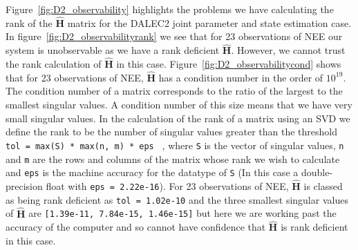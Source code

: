 \documentclass[11pt]{article}
\begin{document}
Figure~\ref{fig:D2_observability} highlights the problems we have calculating the rank of the $\hat{\textbf{H}}$ matrix for the DALEC2 joint parameter and state estimation case. In figure~\ref{fig:D2_observabilityrank} we see that for 23 observations of NEE our system is unobservable as we have a rank deficient $\hat{\textbf{H}}$. However, we cannot trust the rank calculation of $\hat{\textbf{H}}$ in this case. Figure~\ref{fig:D2_observabilitycond} shows that for 23 observations of NEE, $\hat{\textbf{H}}$ has a condition number in the order of $10^{19}$. The condition number of a matrix corresponds to the ratio of the largest to the smallest singular values. A condition number of this size means that we have very small singular values. In the calculation of the rank of a matrix using an SVD we define the rank to be the number of singular values greater than the threshold \texttt{ tol = max(S) * max(n, m) * eps } \citep{press2007numerical}, where \texttt{S} is the vector of singular values, \texttt{n} and \texttt{m} are the rows and columns of the matrix whose rank we wish to calculate and \texttt{eps} is the machine accuracy for the datatype of \texttt{S} (In this case a double-precision float with \texttt{eps = 2.22e-16}). For 23 observations of NEE, $\hat{\textbf{H}}$ is classed as being rank deficient as \texttt{tol = 1.02e-10} and the three smallest singular values of $\hat{\textbf{H}}$ are \texttt{[1.39e-11, 7.84e-15, 1.46e-15]} but here we are working past the accuracy of the computer and so cannot have confidence that $\hat{\textbf{H}}$ is rank deficient in this case.
\end{document}
